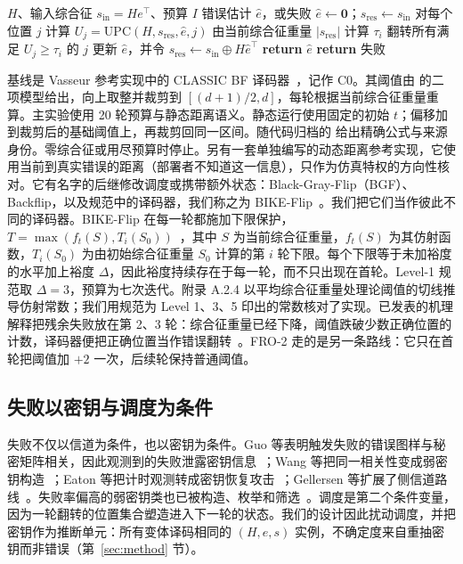 \documentclass[UTF8,a4paper,10pt,onecolumn]{ctexart}
\begin{document}
\begin{algorithm}[t]
\caption{普通 BF 译码}
\label{alg:bf}
\begin{algorithmic}[1]
\Require $H$、输入综合征 $s_{\mathrm{in}}=He^{\top}$、预算 $I$
\Ensure 错误估计 $\hat e$，或失败
\State $\hat e \gets \mathbf{0}$；$s_{\mathrm{res}} \gets s_{\mathrm{in}}$
  \State 对每个位置 $j$ 计算 $U_j=\mathrm{UPC}(H,s_{\mathrm{res}},\hat e,j)$
  \State 由当前综合征重量 $|s_{\mathrm{res}}|$ 计算 $\tau_i$
  \State 翻转所有满足 $U_j\ge\tau_i$ 的 $j$
  \State 更新 $\hat e$，并令 $s_{\mathrm{res}}\gets s_{\mathrm{in}}\oplus H\hat e^{\top}$
    \State \textbf{return} $\hat e$
  \EndIf
\EndFor
\State \textbf{return} 失败
\end{algorithmic}
\end{algorithm}

基线是 Vasseur 参考实现中的 CLASSIC BF 译码器~\cite{vasseur2021thesis}，记作 C0。其阈值由  的二项模型给出，向上取整并裁剪到 $[(d+1)/2,d]$，每轮根据当前综合征重量重算。主实验使用 20 轮预算与静态距离语义。静态运行使用固定的初始 $t$；偏移加到裁剪后的基础阈值上，再裁剪回同一区间。随代码归档的  给出精确公式与来源身份。零综合征或用尽预算时停止。另有一套单独编写的动态距离参考实现，它使用当前到真实错误的距离（部署者不知道这一信息），只作为仿真特权的方向性核对。它有名字的后继修改调度或携带额外状态：Black-Gray-Flip（BGF）、Backflip，以及规范中的译码器，我们称之为 BIKE-Flip~\cite{drucker2020shades,vasseur2021thesis,bike2024spec}。我们把它们当作彼此不同的译码器。BIKE-Flip 在每一轮都施加下限保护，$T=\max(f_t(S),T_i(S_0))$~\cite{bike2024spec}，其中 $S$ 为当前综合征重量，$f_t(S)$ 为其仿射函数，$T_i(S_0)$ 为由初始综合征重量 $S_0$ 计算的第 $i$ 轮下限。每个下限等于未加裕度的水平加上裕度 $\Delta$，因此裕度持续存在于每一轮，而不只出现在首轮。Level-1 规范取 $\Delta=3$，预算为七次迭代。附录 A.2.4 以平均综合征重量处理论阈值的切线推导仿射常数；我们用规范为 Level 1、3、5 印出的常数核对了实现。已发表的机理解释把残余失败放在第 2、3 轮：综合征重量已经下降，阈值跌破少数正确位置的计数，译码器便把正确位置当作错误翻转~\cite{sendrier2024seminar,wang2023weak}。FRO-2 走的是另一条路线：它只在首轮把阈值加 $+2$ 一次，后续轮保持普通阈值。

\subsection{失败以密钥与调度为条件}

失败不仅以信道为条件，也以密钥为条件。Guo 等表明触发失败的错误图样与秘密矩阵相关，因此观测到的失败泄露密钥信息~\cite{guo2016key}；Wang 等把同一相关性变成弱密钥构造~\cite{wang2023weak}；Eaton 等把计时观测转成密钥恢复攻击~\cite{eaton2018timing}；Gellersen 等扩展了侧信道路线~\cite{gellersen2025}。失败率偏高的弱密钥类也已被构造、枚举和筛选~\cite{vasseur2021thesis,nosouhi2023weakkey,matthews2025combinatorial}。调度是第二个条件变量，因为一轮翻转的位置集合塑造进入下一轮的状态。我们的设计因此扰动调度，并把密钥作为推断单元：所有变体译码相同的 $(H,e,s)$ 实例，不确定度来自重抽密钥而非错误（第~\ref{sec:method} 节）。
\end{document}
